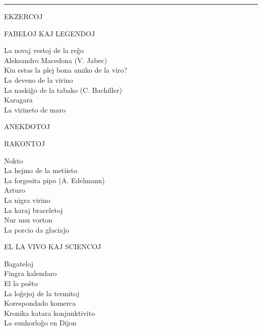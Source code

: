 \begin{center}
\thispagestyle{plain}
\end{center}

{ %

\setlength{\parindent}{0pt}
\setlength{\parskip}{1em}

{\centering \rule{13mm}{0.4pt}\par}

{\sansfont EKZERCOJ} \dotfill \pageref{ekzercoj}

{\centering \sansfont FABELOJ KAJ LEGENDOJ\par}

La novaj vestoj de la reĝo \dotfill \pageref{novajvestoj} \\
Aleksandro Macedona (V. Jabec) \dotfill \pageref{aleksandro} \\
Kiu estas la plej bona amiko de la viro? \dotfill \pageref{plejbona} \\
La deveno de la virino \dotfill \pageref{deveno} \\
La naskiĝo de la tabako (C. Bachiller) \dotfill \pageref{tabako}\\
Karagara \dotfill \pageref{karagara} \\
La virineto de maro \dotfill \pageref{virineto}

{\sansfont ANEKDOTOJ} \dotfill \pageref{anekdotoj}

{\centering \sansfont RAKONTOJ\par}

Nokto \dotfill \pageref{nokto} \\
La hejmo de la metiisto \dotfill \pageref{metiisto}\\
La forgesita pipo (A. Edelmann) \dotfill \pageref{pipo}\\
Arturo \dotfill \pageref{arturo}\\
La nigra virino \dotfill \pageref{nigra}\\
La karaj braceletoj \dotfill \pageref{braceletoj}\\
Nur unu vorton \dotfill \pageref{unuvorton}\\
La porcio da glaciaĵo \dotfill \pageref{porcio}

{\centering \sansfont EL LA VIVO KAJ SCIENCOJ\par}

Bagateloj \dotfill \pageref{bagateloj} \\
Fingra kalendaro \dotfill \pageref{fingra} \\
El la poŝto \dotfill \pageref{posxto} \\
La loĝejoj de la termitoj \dotfill \pageref{termitoj} \\
Korespondado komerca \dotfill \pageref{komerca} \\
Kronika katara konjunktivito \dotfill \pageref{kronika} \\
La sunhorloĝo en Dijon \dotfill \pageref{dijon} 

}
